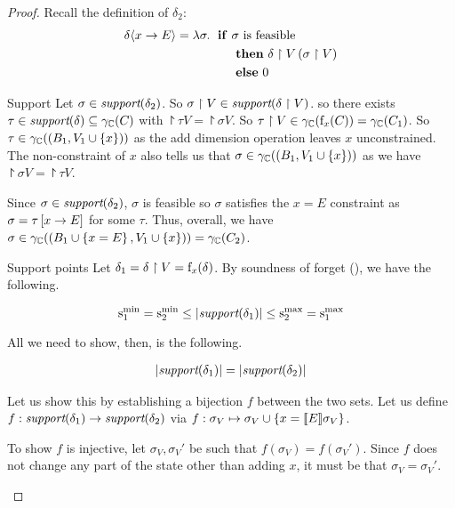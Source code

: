 \begin{proof}
Recall the definition of $ \delta_2 $:
\begin{align*}
\delta \langle x \rightarrow E \rangle = \lambda \sigma . \; \text{ \textbf{if} } & \sigma \text{ is
feasible} \\
& \text{ \textbf{then} } \delta \upharpoonright V \left( \sigma \upharpoonright V \right) \\
& \text{ \textbf{else} } 0
\end{align*}

\begin{subproof}{ Support} Let
$ \sigma \in \textit{support}(\delta_2) $. So
$ \sigma \upharpoonright V \in \textit{support}(\delta \upharpoonright V) $. so there
exists $ \tau \in \textit{support}(\delta) \subseteq \gamma_{\mathbb{C}}(C_{}) $ with $ \project{\tau}{V}
= \project{\sigma}{V} $. So
$ \tau \upharpoonright V \in \gamma_{\mathbb{C}}(\mathrm{f}_{x}(C_{}))
= \gamma_{\mathbb{C}}(C_{1}) $. So $ \tau \in \gamma_{\mathbb{C}}((B_1, V_1 \cup \left\{ x \right\}))
$ as the add dimension operation leaves $ x $ unconstrained. The
non-constraint of $ x $ also tells us that
$ \sigma \in \gamma_{\mathbb{C}}((B_1, V_1 \cup \left\{ x \right\})) $ as we have
$ \project{\sigma}{V} = \project{\tau}{V} $.

Since $ \sigma \in \textit{support}(\delta_2)$, $ \sigma $ is feasible so
$ \sigma $ satisfies the $ x = E $ constraint as $ \sigma
= \tau \left[ x \rightarrow E \right] $ for some $ \tau $. Thus, overall, we have
$ \sigma \in \gamma_{\mathbb{C}}((B_1 \cup \left\{ x = E \right\}, V_1 \cup \left\{ x \right\}))
= \gamma_{\mathbb{C}}(C_{2}) $.
\end{subproof}

\begin{subproof}{ Support points} Let $ \delta_1 =
\delta \upharpoonright V = \mathrm{f}_{x}(\delta) $. By soundness of
forget (), we have the following.

$$ \mathrm{s}^\mathrm{min}_{1} = \mathrm{s}^\mathrm{min}_{2} \leq \left| \textit{support}(\delta_1) \right| \leq \mathrm{s}^\mathrm{max}_{2}
= \mathrm{s}^\mathrm{max}_{1} $$

All we need to show, then, is the following.

\begin{align}
\label{thm:pp:assign:claim1} \setsize{\support{\delta_1}} = \setsize{\support{\delta_2}}
\end{align}

Let us show this by establishing a bijection $ f $ between the two sets. Let us define $ f
: \textit{support}(\delta_1) \rightarrow \textit{support}(\delta_2) $ via $ f
: \sigma_V \mapsto \sigma_V \cup \left\{ x = [\![{E}]\!]{\sigma_V} \right\} $.

To show $ f $ is injective, let $ \sigma_V, \sigma_V'$ be such that $
f(\sigma_V) = f(\sigma_V') $. Since $ f $ does not change any part of
the state other than adding $ x $, it must be that $ \sigma_V
= \sigma_V' $.


\end{subproof}
\end{proof}
